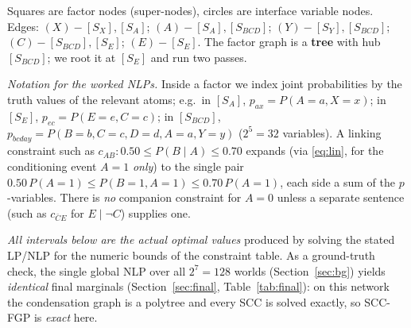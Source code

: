 \documentclass[11pt]{article}
\begin{document}
\begin{center}
\end{center}

Squares are factor nodes (super-nodes), circles are interface variable nodes.
Edges: $(X)\!-\![S_X],[S_A]$; $(A)\!-\![S_A],[S_{BCD}]$;
$(Y)\!-\![S_Y],[S_{BCD}]$; $(C)\!-\![S_{BCD}],[S_E]$; $(E)\!-\![S_E]$. The
factor graph is a \textbf{tree} with hub $[S_{BCD}]$; we root it at $[S_E]$
and run two passes.

\medskip
\noindent\emph{Notation for the worked NLPs.} Inside a factor we index joint
probabilities by the truth values of the relevant atoms; e.g.\ in $[S_A]$,
$p_{ax}=P(A{=}a,X{=}x)$; in $[S_E]$, $p_{ec}=P(E{=}e,C{=}c)$; in $[S_{BCD}]$,
$p_{bcday}=P(B{=}b,C{=}c,D{=}d,A{=}a,Y{=}y)$ ($2^5=32$ variables). A linking
constraint such as $c_{AB}: 0.50\le P(B\mid A)\le 0.70$ expands (via
\eqref{eq:lin}, for the conditioning event $A{=}1$ \emph{only}) to the single
pair
$0.50\,P(A{=}1)\le P(B{=}1,A{=}1)\le 0.70\,P(A{=}1)$, each side a sum of the
$p$-variables. There is \emph{no} companion constraint for $A{=}0$ unless a
separate sentence (such as $c_{\bar C E}$ for $E\mid\neg C$) supplies one.

\medskip
\noindent\emph{All intervals below are the actual optimal values} produced by
solving the stated LP/NLP for the numeric bounds of the constraint table. As a
ground-truth check, the single global NLP over all $2^7=128$ worlds
(Section~\ref{sec:bg}) yields \emph{identical} final marginals
(Section~\ref{sec:final}, Table~\ref{tab:final}): on this network the
condensation graph is a polytree and every SCC is solved exactly, so SCC-FGP is
\emph{exact} here.
\end{document}
